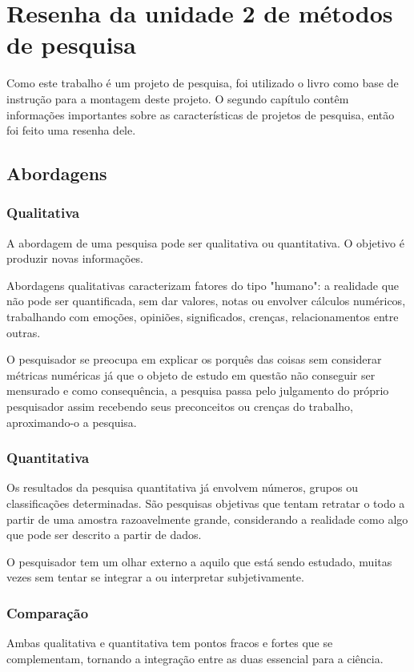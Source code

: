 \chapter{Resenha da unidade 2 de métodos de pesquisa}

Como este trabalho é um projeto de pesquisa, foi utilizado o livro \cite{met_pesquisa} como base de instrução para a montagem deste projeto. O segundo capítulo contêm informações importantes sobre as características de projetos de pesquisa, então foi feito uma resenha dele.

\section{Abordagens}
\subsection{Qualitativa}

A abordagem de uma pesquisa pode ser qualitativa ou quantitativa. O objetivo é produzir novas informações.

Abordagens qualitativas caracterizam fatores do tipo "humano": a realidade que não pode ser quantificada, sem dar valores, notas ou envolver cálculos numéricos, trabalhando com emoções, opiniões, significados, crenças, relacionamentos entre outras.

O pesquisador se preocupa em explicar os porquês das coisas sem considerar métricas numéricas já que o objeto de estudo em questão não conseguir ser mensurado e como consequência, a pesquisa passa pelo julgamento do próprio pesquisador assim recebendo seus preconceitos ou crenças do trabalho, aproximando-o a pesquisa.

\subsection{Quantitativa}
Os resultados da pesquisa quantitativa já envolvem números, grupos ou classificações determinadas. São pesquisas objetivas que tentam retratar o todo a partir de uma amostra razoavelmente grande, considerando a realidade como algo que pode ser descrito a partir de dados.

O pesquisador tem um olhar externo a aquilo que está sendo estudado, muitas vezes sem tentar se integrar a ou interpretar subjetivamente.

\subsection{Comparação}
Ambas qualitativa e quantitativa tem pontos fracos e fortes que se complementam,     tornando a integração entre as duas essencial para a ciência.


